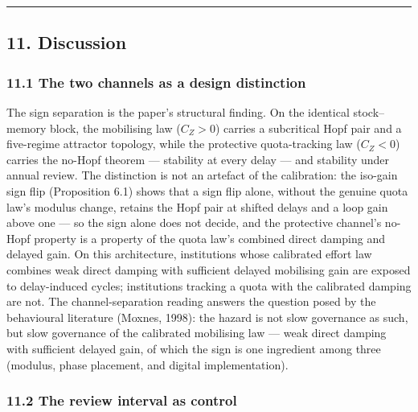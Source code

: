 \documentclass[11pt]{article}
\begin{document}
\begin{center}\rule{0.5\linewidth}{0.5pt}\end{center}

\subsection{11. Discussion}\label{discussion}

\subsubsection{11.1 The two channels as a design
distinction}\label{the-two-channels-as-a-design-distinction}

The sign separation is the paper's structural finding. On the identical
stock--memory block, the mobilising law (\(C_Z > 0\)) carries a
subcritical Hopf pair and a five-regime attractor topology, while the
protective quota-tracking law (\(C_Z < 0\)) carries the no-Hopf theorem
--- stability at every delay --- and stability under annual review. The
distinction is not an artefact of the calibration: the iso-gain sign
flip (Proposition 6.1) shows that a sign flip alone, without the genuine
quota law's modulus change, retains the Hopf pair at shifted delays and
a loop gain above one --- so the sign alone does not decide, and the
protective channel's no-Hopf property is a property of the quota law's
combined direct damping and delayed gain. On this architecture,
institutions whose calibrated effort law combines weak direct damping
with sufficient delayed mobilising gain are exposed to delay-induced
cycles; institutions tracking a quota with the calibrated damping are
not. The channel-separation reading answers the question posed by the
behavioural literature (Moxnes, 1998): the hazard is not slow governance
as such, but slow governance of the calibrated mobilising law --- weak
direct damping with sufficient delayed gain, of which the sign is one
ingredient among three (modulus, phase placement, and digital
implementation).

\subsubsection{11.2 The review interval as
control}\label{the-review-interval-as-control-1}
\end{document}
